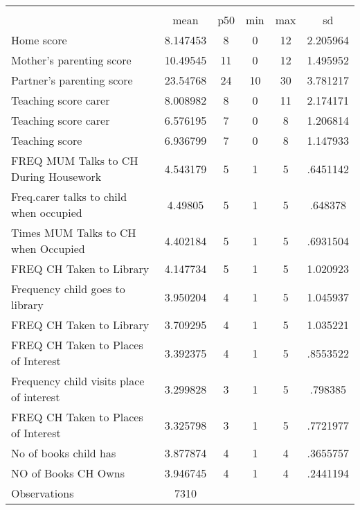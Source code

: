 {
\def\sym#1{\ifmmode^{#1}\else\(^{#1}\)\fi}
\begin{tabular}{l*{1}{ccccc}}
\toprule
                    &\multicolumn{5}{c}{}                                            \\
                    &        mean&         p50&         min&         max&          sd\\
\midrule
Home score          &    8.147453&           8&           0&          12&    2.205964\\
Mother's parenting score&    10.49545&          11&           0&          12&    1.495952\\
Partner's parenting score&    23.54768&          24&          10&          30&    3.781217\\
Teaching score carer&    8.008982&           8&           0&          11&    2.174171\\
Teaching score carer&    6.576195&           7&           0&           8&    1.206814\\
Teaching score      &    6.936799&           7&           0&           8&    1.147933\\
FREQ MUM Talks to CH During Housework&    4.543179&           5&           1&           5&    .6451142\\
Freq.carer talks to child when occupied&     4.49805&           5&           1&           5&     .648378\\
Times MUM Talks to CH when Occupied&    4.402184&           5&           1&           5&    .6931504\\
FREQ CH Taken to Library&    4.147734&           5&           1&           5&    1.020923\\
Frequency child goes to library&    3.950204&           4&           1&           5&    1.045937\\
FREQ CH Taken to Library&    3.709295&           4&           1&           5&    1.035221\\
FREQ CH Taken to Places of Interest&    3.392375&           4&           1&           5&    .8553522\\
Frequency child visits place of interest&    3.299828&           3&           1&           5&     .798385\\
FREQ CH Taken to Places of Interest&    3.325798&           3&           1&           5&    .7721977\\
No of books child has&    3.877874&           4&           1&           4&    .3655757\\
NO of Books CH Owns &    3.946745&           4&           1&           4&    .2441194\\
\midrule
Observations        &        7310&            &            &            &            \\
\bottomrule
\end{tabular}
}
